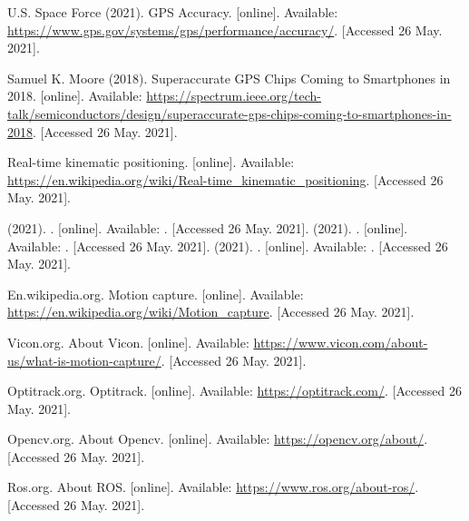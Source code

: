 
\label{bib:1}  U.S. Space Force (2021). GPS Accuracy. [online]. Available: \url{https://www.gps.gov/systems/gps/performance/accuracy/}. [Accessed 26 May. 2021].

\label{bib:2}  Samuel K. Moore (2018). Superaccurate GPS Chips Coming to Smartphones in 2018. [online]. Available: \url{https://spectrum.ieee.org/tech-talk/semiconductors/design/superaccurate-gps-chips-coming-to-smartphones-in-2018}. [Accessed 26 May. 2021].

\label{bib:3}  Real-time kinematic positioning. [online]. Available: \url{https://en.wikipedia.org/wiki/Real-time_kinematic_positioning}. [Accessed 26 May. 2021].

% 
\label{bib:4}   (2021). . [online]. Available: \url{}. [Accessed 26 May. 2021].
\label{bib:5}   (2021). . [online]. Available: \url{}. [Accessed 26 May. 2021].
\label{bib:6}   (2021). . [online]. Available: \url{}. [Accessed 26 May. 2021].



\label{bib:7}  En.wikipedia.org. Motion capture. [online]. Available: \url{https://en.wikipedia.org/wiki/Motion_capture}. [Accessed 26 May. 2021].

\label{bib:8}  Vicon.org. About Vicon. [online]. Available: \url{https://www.vicon.com/about-us/what-is-motion-capture/}. [Accessed 26 May. 2021].

\label{bib:9}  Optitrack.org. Optitrack. [online]. Available: \url{https://optitrack.com/}. [Accessed 26 May. 2021].


\label{bib:10}  Opencv.org. About Opencv. [online]. Available: \url{https://opencv.org/about/}. [Accessed 26 May. 2021].

\label{bib:11}  Ros.org. About ROS. [online]. Available: \url{https://www.ros.org/about-ros/}. [Accessed 26 May. 2021].



